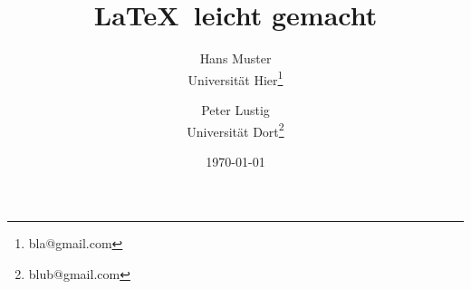 \documentclass[10pt]{article}
\begin{document}
\title{\LaTeX\ leicht gemacht}

\author{Hans Muster\\Universität Hier\thanks{bla@gmail.com} \and Peter Lustig\\Universität Dort\thanks{blub@gmail.com}}

\date{\today}

\maketitle


\newpage

\blindtext
\end{document}
